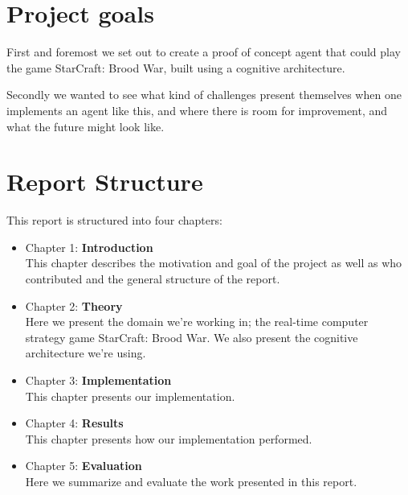 \section{Project goals}
\label{sec:goals}
First and foremost we set out to create a proof of concept agent that could play the game StarCraft: Brood War, built using a cognitive architecture.

Secondly we wanted to see what kind of challenges present themselves when one implements an agent like this, and where there is room for improvement, and what the future might look like.

\section{Report Structure}
\label{sec:structure}
This report is structured into four chapters:
\begin{itemize}
\item Chapter 1: \textbf{Introduction} \\
This chapter describes the motivation and goal of the project as well as who
contributed and the general structure of the report.
\item Chapter 2: \textbf{Theory} \\
Here we present the domain we're working in; the real-time computer strategy game StarCraft: Brood War. We also present the cognitive architecture we're using.
\item Chapter 3: \textbf{Implementation} \\
This chapter presents our implementation.
\item Chapter 4: \textbf{Results} \\
This chapter presents how our implementation performed.
\item Chapter 5: \textbf{Evaluation} \\
Here we summarize and evaluate the work presented in this report.

\end{itemize}